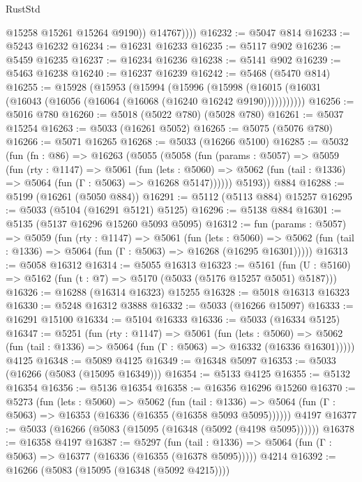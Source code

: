\begin{lexlean}{RustStd}
\begin{coremodule}
                @15258
                @15261
                @15264
                @9190))
            @14767))))
@16232 := @5047 @814
@16233 := @5243 @16232
@16234 := @16231 @16233
@16235 := @5117 @902
@16236 := @5459 @16235
@16237 := @16234 @16236
@16238 := @5141 @902
@16239 := @5463 @16238
@16240 := @16237 @16239
@16242 := @5468 (@5470 @814)
@16255 := @15928
    (@15953
      (@15994
        (@15996
          (@15998 (@16015 (@16031 (@16043 (@16056 (@16064 (@16068 (@16240 @16242 @9190)))))))))))
@16256 := @5016 @780
@16260 := @5018 (@5022 @780) (@5028 @780)
@16261 := @5037 @15254
@16263 := @5033 (@16261 @5052)
@16265 := @5075 (@5076 @780)
@16266 := @5071 @16265
@16268 := @5033 (@16266 @5100)
@16285 := @5032
    (fun (fn : @86) =>
    @16263
      (@5055
        (@5058
          (fun (params : @5057) =>
          @5059
            (fun (rty : @1147) =>
            @5061
              (fun (lets : @5060) =>
              @5062 (fun (tail : @1336) => @5064 (fun (Γ : @5063) => @16268 @5147))))))
        @5193))
    @884
@16288 := @5199 (@16261 (@5050 @884))
@16291 := @5112 (@5113 @884) @15257
@16295 := @5033 (@5104 (@16291 @5121) @5125)
@16296 := @5138 @884
@16301 := @5135 (@5137 @16296 @15260 @5093 @5095)
@16312 := fun (params : @5057) =>
  @5059
    (fun (rty : @1147) =>
    @5061
      (fun (lets : @5060) =>
      @5062 (fun (tail : @1336) => @5064 (fun (Γ : @5063) => @16268 (@16295 @16301)))))
@16313 := @5058 @16312
@16314 := @5055 @16313
@16323 := @5161
    (fun (U : @5160) => @5162 (fun (t : @7) => @5170 (@5033 (@5176 @15257 @5051) @5187)))
@16326 := @16288 (@16314 @16323) @15255
@16328 := @5018 @16313 @16323
@16330 := @5248 @16312 @3888
@16332 := @5033 (@16266 @15097)
@16333 := @16291 @15100
@16334 := @5104 @16333
@16336 := @5033 (@16334 @5125)
@16347 := @5251
    (fun (rty : @1147) =>
    @5061
      (fun (lets : @5060) =>
      @5062 (fun (tail : @1336) => @5064 (fun (Γ : @5063) => @16332 (@16336 @16301)))))
    @4125
@16348 := @5089 @4125
@16349 := @16348 @5097
@16353 := @5033 (@16266 (@5083 (@15095 @16349)))
@16354 := @5133 @4125
@16355 := @5132 @16354
@16356 := @5136 @16354
@16358 := @16356 @16296 @15260
@16370 := @5273
    (fun (lets : @5060) =>
    @5062
      (fun (tail : @1336) =>
      @5064 (fun (Γ : @5063) => @16353 (@16336 (@16355 (@16358 @5093 @5095))))))
    @4197
@16377 := @5033 (@16266 (@5083 (@15095 (@16348 (@5092 (@4198 @5095))))))
@16378 := @16358 @4197
@16387 := @5297
    (fun (tail : @1336) => @5064 (fun (Γ : @5063) => @16377 (@16336 (@16355 (@16378 @5095)))))
    @4214
@16392 := @16266 (@5083 (@15095 (@16348 (@5092 @4215))))

\end{coremodule}
\end{lexlean}
